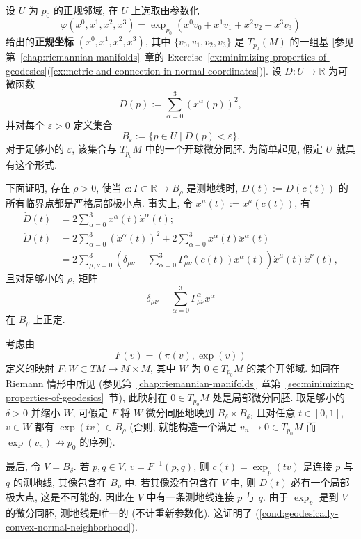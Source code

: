 \begin{RiemannProof}
设 $U$ 为 $p_0$ 的正规邻域, 在 $U$ 上选取由参数化
\[
  \varphi(x^0,x^1,x^2,x^3)=\exp_{p_0}(x^0v_0+x^1v_1+x^2v_2+x^3v_3)
\]
给出的\textbf{正规坐标} $(x^0,x^1,x^2,x^3)$, 其中 $\{v_0,v_1,v_2,v_3\}$ 是 $T_{p_0}(M)$ 的一组基 [参见第~\ref{chap:riemannian-manifolds}~章的 Exercise~\ref{ex:minimizing-properties-of-geodesics}(\ref{ex:metric-and-connection-in-normal-coordinates})]. 设 $D:U\to\mathbb{R}$ 为可微函数
\[
  D(p):=\sum_{\alpha=0}^3(x^\alpha(p))^2,
\]
并对每个 $\varepsilon>0$ 定义集合
\[
  B_\varepsilon:=\{p\in U\mid D(p)<\varepsilon\}.
\]
对于足够小的 $\varepsilon$, 该集合与 $T_{p_0}M$ 中的一个开球微分同胚. 为简单起见, 假定 $U$ 就具有这个形式.

下面证明, 存在 $\rho>0$, 使当 $c:I\subset\mathbb{R}\to B_\rho$ 是测地线时, $D(t):=D(c(t))$ 的所有临界点都是严格局部极小点. 事实上, 令 $x^\mu(t):=x^\mu(c(t))$, 有
\begin{align*}
  \dot D(t)&=2\sum_{\alpha=0}^3 x^\alpha(t)\dot x^\alpha(t);\\
  \ddot D(t)&=2\sum_{\alpha=0}^3(\dot x^\alpha(t))^2
       +2\sum_{\alpha=0}^3x^\alpha(t)\ddot x^\alpha(t)\\
       &=2\sum_{\mu,\nu=0}^3\left(\delta_{\mu\nu}
            -\sum_{\alpha=0}^3\Gamma_{\mu\nu}^\alpha(c(t))x^\alpha(t)\right)
            \dot x^\mu(t)\dot x^\nu(t),
\end{align*}
且对足够小的 $\rho$, 矩阵
\[
  \delta_{\mu\nu}-\sum_{\alpha=0}^3\Gamma_{\mu\nu}^\alpha x^\alpha
\]
在 $B_\rho$ 上正定.

考虑由
\[
  F(v)=(\pi(v),\exp(v))
\]
定义的映射 $F:W\subset TM\to M\times M$, 其中 $W$ 为 $0\in T_{p_0}M$ 的某个开邻域. 如同在 Riemann 情形中所见 (参见第~\ref{chap:riemannian-manifolds}~章第~\ref{sec:minimizing-properties-of-geodesics}~节), 此映射在 $0\in T_{p_0}M$ 处是局部微分同胚. 取足够小的 $\delta>0$ 并缩小 $W$, 可假定 $F$ 将 $W$ 微分同胚地映到 $B_\delta\times B_\delta$, 且对任意 $t\in[0,1]$, $v\in W$ 都有 $\exp(tv)\in B_\rho$ (否则, 就能构造一个满足 $v_n\to0\in T_{p_0}M$ 而 $\exp(v_n)\not\to p_0$ 的序列).

最后, 令 $V=B_\delta$. 若 $p,q\in V$, $v=F^{-1}(p,q)$, 则 $c(t)=\exp_p(tv)$ 是连接 $p$ 与 $q$ 的测地线, 其像包含在 $B_\rho$ 中. 若其像没有包含在 $V$ 中, 则 $D(t)$ 必有一个局部极大点, 这是不可能的. 因此在 $V$ 中有一条测地线连接 $p$ 与 $q$. 由于 $\exp_p$ 是到 $V$ 的微分同胚, 测地线是唯一的 (不计重新参数化). 这证明了 (\ref{cond:geodesically-convex-normal-neighborhood}).


\end{RiemannProof}
